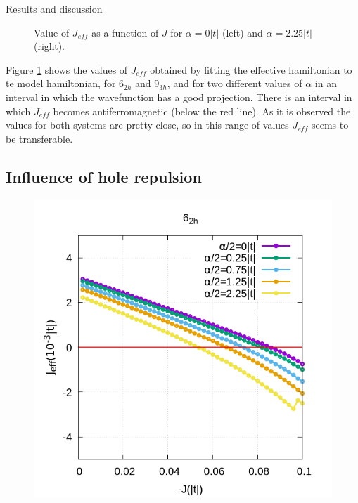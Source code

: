 \documentclass[12pt,twoside]{report}
\begin{document}
\begin{chapter}{Results and discussion}
\begin{figure}[h!]
\begin{minipage}{0.4\textwidth}
		\end{minipage}
		\caption{\label{fig_arj} Value of $J_{eff}$ as a function of $J$ for $\alpha=0|t|$ (left) and $\alpha=2.25|t|$ (right). }
	\end{figure}

	Figure \ref{fig_arj} shows the values of $J_{eff}$ obtained by fitting the
	effective hamiltonian to te model hamiltonian, for 6$_{2h}$ and 9$_{3h}$, and
	for two different values of $\alpha$ in an interval in which the
	wavefunction has a good projection. There is an interval in which $J_{eff}$
	becomes antiferromagnetic (below the red line). As it is observed the values
	for both systems are pretty close, so in this range of values $J_{eff}$
	seems to be transferable.

	

	
	\subsection{Influence of hole repulsion}
		\begin{figure}[h!]
		\centering
		\hspace{-2cm}
		\begin{minipage}{0.4\textwidth}
			\includegraphics[scale=0.3]{Jeff_vs_J_ar2.png}
		\end{minipage}
		\hspace{2cm}

\end{figure}
\end{chapter}
\end{document}
